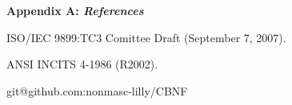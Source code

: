 \vfill\break
\centerline{\bf Appendix A: \it References}

\noindent ISO/IEC 9899:TC3 Comittee Draft (September 7, 2007).

\noindent ANSI INCITS 4-1986 (R2002).

\noindent git@github.com:nonmasc-lilly/CBNF
